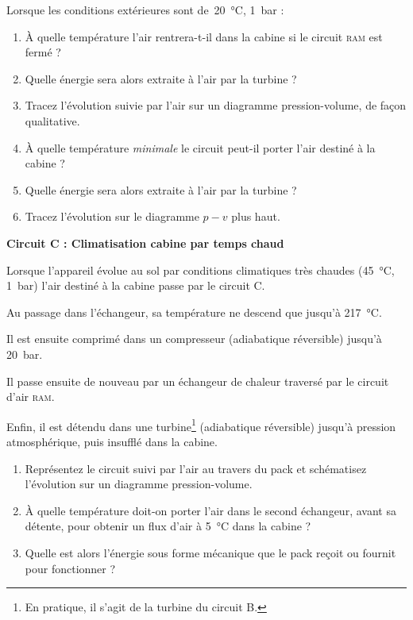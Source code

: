 	Lorsque les conditions extérieures sont de~\SI{20}{\degreeCelsius}, \SI{1}{\bar} :
	
	\begin{enumerate}
		\item À quelle température l’air rentrera-t-il dans la cabine si le circuit \textsc{ram} est fermé ?
		\item Quelle énergie sera alors extraite à l’air par la turbine ?
		\item Tracez l’évolution suivie par l’air sur un diagramme pression-volume, de façon qualitative.
		\item À quelle température \emph{minimale} le circuit peut-il porter l’air destiné à la cabine ?
		\item Quelle énergie sera alors extraite à l’air par la turbine ?
		\item Tracez l’évolution sur le diagramme $p-v$ plus haut.
	\end{enumerate}

\onlyframabook{\clearpage}
\textbf{Circuit C : Climatisation cabine par temps chaud}

	Lorsque l’appareil évolue au sol par conditions climatiques très chaudes (\SI{45}{\degreeCelsius}, \SI{1}{\bar}) l’air destiné à la cabine passe par le circuit C.
	
	Au passage dans l’échangeur, sa température ne descend que jusqu’à \SI{217}{\degreeCelsius}. 
	
	Il est ensuite comprimé dans un compresseur (adiabatique réversible) jusqu’à \SI{20}{\bar}. 
	
	Il passe ensuite de nouveau par un échangeur de chaleur traversé par le circuit d’air \textsc{ram}.
	
	Enfin, il est détendu dans une turbine\footnote{En pratique, il s’agit de la turbine du circuit B.} (adiabatique réversible) jusqu’à pression atmosphérique, puis insufflé dans la cabine.
		
	\begin{enumerate}
		\item Représentez le circuit suivi par l’air au travers du pack et schématisez l’évolution sur un diagramme pression-volume.
		\item À quelle température doit-on porter l’air dans le second échangeur, avant sa détente, pour obtenir un flux d’air à \SI{5}{\degreeCelsius} dans la cabine ?
		\item Quelle est alors l’énergie sous forme mécanique que le pack reçoit ou fournit pour fonctionner ?
	\end{enumerate}

